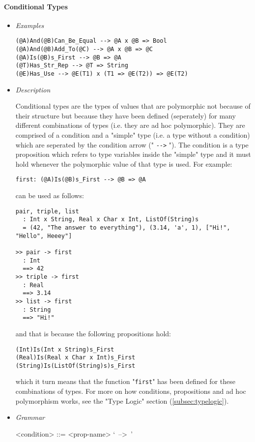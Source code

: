 \documentclass{article}
\begin{document}
\newpage

\paragraph{Conditional Types}

\begin{itemize}
\item \textit{Examples}
\begin{verbatim}
(@A)And(@B)Can_Be_Equal --> @A x @B => Bool
(@A)And(@B)Add_To(@C) --> @A x @B => @C
(@A)Is(@B)s_First --> @B => @A
(@T)Has_Str_Rep --> @T => String
(@E)Has_Use --> @E(T1) x (T1 => @E(T2)) => @E(T2)
\end{verbatim}

\item \textit{Description}

Conditional types are the types of values that are polymorphic not because of
their structure but because they have been defined (seperately) for many
different combinations of types (i.e. they are ad hoc polymorphic). They are
comprised of a condition and a "simple" type (i.e. a type without a condition)
which are seperated by the condition arrow (" \verb|-->| "). The condition is
a type proposition which refers to type variables inside the "simple" type and
it must hold whenever the polymorphic value of that type is used. For example:
\begin{verbatim}
first: (@A)Is(@B)s_First --> @B => @A
\end{verbatim}
can be used as follows:
\begin{verbatim}
pair, triple, list
  : Int x String, Real x Char x Int, ListOf(String)s
  = (42, "The answer to everything"), (3.14, 'a', 1), ["Hi!", "Hello", Heeey"]

>> pair -> first
  : Int
  ==> 42
>> triple -> first
  : Real
  ==> 3.14
>> list -> first
  : String
  ==> "Hi!"
\end{verbatim}
and that is because the following propositions hold:
\begin{verbatim}
(Int)Is(Int x String)s_First
(Real)Is(Real x Char x Int)s_First
(String)Is(ListOf(String)s)s_First
\end{verbatim}
which it turn means that the function "\verb|first|" has been defined for these
combinations of types. For more on how conditions, propositions and ad hoc
polymorphism works, see the "Type Logic" section (\ref{subsec:typelogic}).

\item \textit{Grammar}
\begin{grammar}
<condition> ::= <prop-name> `\ -->\ ' 
\end{grammar}

\end{itemize}
\end{document}
